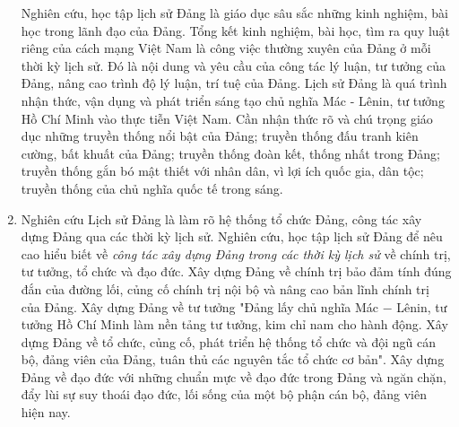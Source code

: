 \begin{enumerate}
Nghiên cứu, học tập lịch sử Đảng là giáo dục sâu sắc những kinh nghiệm, bài học trong lãnh đạo của Đảng. Tổng kết kinh nghiệm, bài học, tìm ra quy luật riêng của cách mạng Việt Nam là công việc thường xuyên của Đảng ở mỗi thời kỳ lịch sử. Đó là nội dung và yêu cầu của công tác lý luận, tư tưởng của Đảng, nâng cao trình độ lý luận, trí tuệ của Đảng. Lịch sử Đảng là quá trình nhận thức, vận dụng và phát triển sáng tạo chủ nghĩa Mác - Lênin, tư tưởng Hồ Chí Minh vào thực tiễn Việt Nam. Cần nhận thức rõ và chú trọng giáo dục những truyền thống nổi bật của Đảng; truyền thống đấu tranh kiên cường, bất khuất của Đảng; truyền thống đoàn kết, thống nhất trong Đảng; truyền thống gắn bó mật thiết với nhân dân, vì lợi ích quốc gia, dân tộc; truyền thống của chủ nghĩa quốc tế trong sáng.
\item Nghiên cứu Lịch sử Đảng là làm rõ hệ thống tổ chức Đảng, công tác xây dựng Đảng qua các thời kỳ lịch sử. Nghiên cứu, học tập lịch sử Đảng để nêu cao hiểu biết về \textit{công tác xây dựng Đảng trong các thời kỳ lịch sử} về chính trị, tư tưởng, tổ chức và đạo đức. Xây dựng Đảng về chính trị bảo đảm tính đúng đắn của đường lối, củng cố chính trị nội bộ và nâng cao bản lĩnh chính trị của Đảng. Xây dựng Đảng về tư tưởng "Đảng lấy chủ nghĩa Mác $-$ Lênin, tư tưởng Hồ Chí Minh làm nền tảng tư tưởng, kim chỉ nam cho hành động. Xây dựng Đảng về tổ chức, củng cố, phát triển hệ thống tổ chức và đội ngũ cán bộ, đảng viên của Đảng, tuân thủ các nguyên tắc tổ chức cơ bản". Xây dựng Đảng về đạo đức với những chuẩn mực về đạo đức trong Đảng và ngăn chặn, đẩy lùi sự suy thoái đạo đức, lối sống của một bộ phận cán bộ, đảng viên hiện nay.
\end{enumerate}